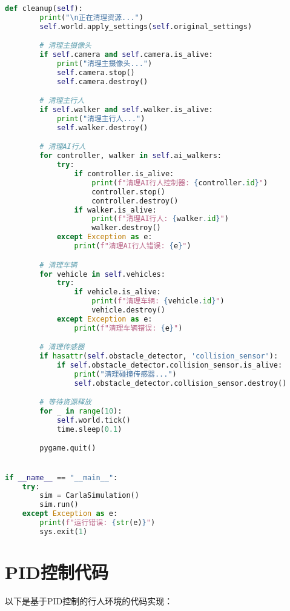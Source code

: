 \begin{lstlisting}[language=Python]
    def cleanup(self):
        print("\n正在清理资源...")
        self.world.apply_settings(self.original_settings)

        # 清理主摄像头
        if self.camera and self.camera.is_alive:
            print("清理主摄像头...")
            self.camera.stop()
            self.camera.destroy()

        # 清理主行人
        if self.walker and self.walker.is_alive:
            print("清理主行人...")
            self.walker.destroy()

        # 清理AI行人
        for controller, walker in self.ai_walkers:
            try:
                if controller.is_alive:
                    print(f"清理AI行人控制器: {controller.id}")
                    controller.stop()
                    controller.destroy()
                if walker.is_alive:
                    print(f"清理AI行人: {walker.id}")
                    walker.destroy()
            except Exception as e:
                print(f"清理AI行人错误: {e}")

        # 清理车辆
        for vehicle in self.vehicles:
            try:
                if vehicle.is_alive:
                    print(f"清理车辆: {vehicle.id}")
                    vehicle.destroy()
            except Exception as e:
                print(f"清理车辆错误: {e}")

        # 清理传感器
        if hasattr(self.obstacle_detector, 'collision_sensor'):
            if self.obstacle_detector.collision_sensor.is_alive:
                print("清理碰撞传感器...")
                self.obstacle_detector.collision_sensor.destroy()

        # 等待资源释放
        for _ in range(10):
            self.world.tick()
            time.sleep(0.1)

        pygame.quit()


if __name__ == "__main__":
    try:
        sim = CarlaSimulation()
        sim.run()
    except Exception as e:
        print(f"运行错误: {str(e)}")
        sys.exit(1)
\end{lstlisting}

\section{PID控制代码}

以下是基于PID控制的行人环境的代码实现：

